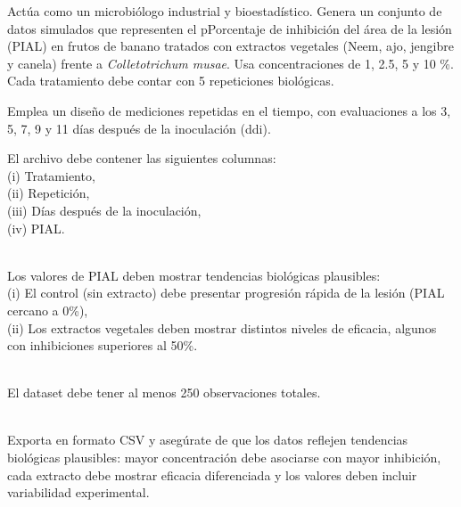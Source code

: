 \documentclass[
  spanish,
  letterpaper,
  DIV=11,
  numbers=noendperiod]{scrreprt}
\begin{document}
\begin{tcolorbox}[enhanced jigsaw, colback=white, breakable, toptitle=1mm, toprule=.15mm, colbacktitle=quarto-callout-tip-color!10!white, bottomrule=.15mm, coltitle=black, titlerule=0mm, opacityback=0, leftrule=.75mm, bottomtitle=1mm, colframe=quarto-callout-tip-color-frame, left=2mm, title=\textcolor{quarto-callout-tip-color}{\faLightbulb}\hspace{0.5em}{Cuarto modelo de Prompt}, rightrule=.15mm, opacitybacktitle=0.6, arc=.35mm]

Actúa como un microbiólogo industrial y bioestadístico. Genera un
conjunto de datos simulados que representen el pPorcentaje de inhibición
del área de la lesión (PIAL) en frutos de banano tratados con extractos
vegetales (Neem, ajo, jengibre y canela) frente a \emph{Colletotrichum
musae}. Usa concentraciones de 1, 2.5, 5 y 10 \%. Cada tratamiento debe
contar con 5 repeticiones biológicas.

Emplea un diseño de mediciones repetidas en el tiempo, con evaluaciones
a los 3, 5, 7, 9 y 11 días después de la inoculación (ddi).

El archivo debe contener las siguientes columnas:\\
(i) Tratamiento,\\
(ii) Repetición,\\
(iii) Días después de la inoculación,\\
(iv) PIAL.\\
\strut \\
Los valores de PIAL deben mostrar tendencias biológicas plausibles:\\
(i) El control (sin extracto) debe presentar progresión rápida de la
lesión (PIAL cercano a 0\%),\\
(ii) Los extractos vegetales deben mostrar distintos niveles de
eficacia, algunos con inhibiciones superiores al 50\%.\\
\strut \\
El dataset debe tener al menos 250 observaciones totales.\\
\strut \\
Exporta en formato CSV y asegúrate de que los datos reflejen tendencias
biológicas plausibles: mayor concentración debe asociarse con mayor
inhibición, cada extracto debe mostrar eficacia diferenciada y los
valores deben incluir variabilidad experimental.

\end{tcolorbox}

\end{document}
